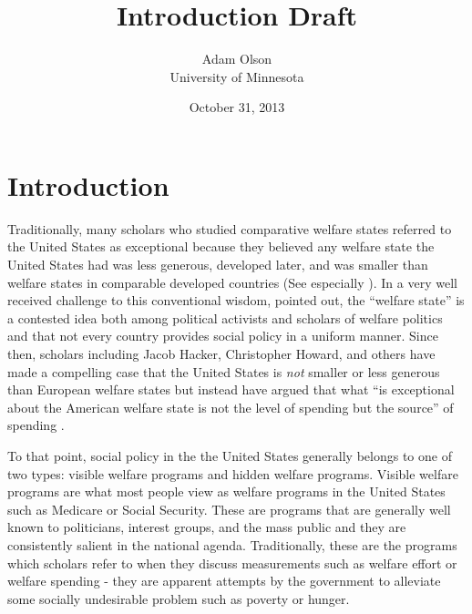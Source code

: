 \documentclass[12pt]{article}
\author{Adam Olson\\University of Minnesota}
\title{Introduction Draft}
\date{October 31, 2013}
\makeatletter
\renewcommand{\maketitle}{\bgroup\setlength{\parindent}{0pt}
\begin{flushleft}
  \textbf{\@title}

  \@author
\end{flushleft}\egroup
}
\makeatother
\begin{document}
\maketitle

\section{Introduction}
Traditionally, many scholars who studied comparative welfare states referred to the United States as exceptional because they believed any welfare state the United States had was less generous, developed later, and was smaller than welfare states in comparable developed countries (See especially \citealt{andersen1990}). In a very well received challenge to this conventional wisdom, \citet{hacker2002} pointed out, the ``welfare state'' is a contested idea both among political activists and scholars of welfare politics and that not every country provides social policy in a uniform manner. Since then, scholars including Jacob Hacker, Christopher Howard, and others have made a compelling case that the United States is \emph{not} smaller or less generous than European welfare states but instead have argued that what ``is exceptional about the American welfare state is not the level of spending but the source'' of spending \citep[pg. 7]{hacker2002}.

To that point, social policy in the the United States generally belongs to one of two types: visible welfare programs and hidden welfare programs. Visible welfare programs are what most people view as welfare programs in the United States such as Medicare or Social Security. These are programs that are generally well known to politicians, interest groups, and the mass public and they are consistently salient in the national agenda. Traditionally, these are the programs which scholars refer to when they discuss measurements such as welfare effort or welfare spending - they are apparent attempts by the government to alleviate some socially undesirable problem such as poverty or hunger.
\end{document}
